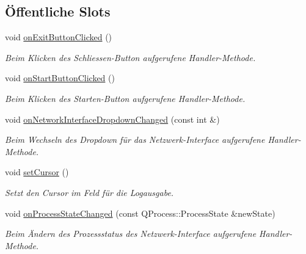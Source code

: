 \subsection*{Öffentliche Slots}
\begin{DoxyCompactItemize}
\item 
\hypertarget{class_server_a99f9b2f3521fb22772a61baf4f3c7bdc}{}\label{class_server_a99f9b2f3521fb22772a61baf4f3c7bdc} 
void \hyperlink{class_server_a99f9b2f3521fb22772a61baf4f3c7bdc}{on\+Exit\+Button\+Clicked} ()
\begin{DoxyCompactList}\small\item\em Beim Klicken des Schliessen-\/\+Button aufgerufene Handler-\/\+Methode. \end{DoxyCompactList}\item 
\hypertarget{class_server_abe8ac23afc4d282f89ec9fac8e7bf7f3}{}\label{class_server_abe8ac23afc4d282f89ec9fac8e7bf7f3} 
void \hyperlink{class_server_abe8ac23afc4d282f89ec9fac8e7bf7f3}{on\+Start\+Button\+Clicked} ()
\begin{DoxyCompactList}\small\item\em Beim Klicken des Starten-\/\+Button aufgerufene Handler-\/\+Methode. \end{DoxyCompactList}\item 
\hypertarget{class_server_abe493e7f3249149eea185fed02a06803}{}\label{class_server_abe493e7f3249149eea185fed02a06803} 
void \hyperlink{class_server_abe493e7f3249149eea185fed02a06803}{on\+Network\+Interface\+Dropdown\+Changed} (const int \&)
\begin{DoxyCompactList}\small\item\em Beim Wechseln des Dropdown für das Netzwerk-\/\+Interface aufgerufene Handler-\/\+Methode. \end{DoxyCompactList}\item 
\hypertarget{class_server_ac32ca0a80f4f1c8f4ec0f1f8db113efa}{}\label{class_server_ac32ca0a80f4f1c8f4ec0f1f8db113efa} 
void \hyperlink{class_server_ac32ca0a80f4f1c8f4ec0f1f8db113efa}{set\+Cursor} ()
\begin{DoxyCompactList}\small\item\em Setzt den Cursor im Feld für die Logausgabe. \end{DoxyCompactList}\item 
void \hyperlink{class_server_a08efa8bc9e0445b13be2af5b6a3037b2}{on\+Process\+State\+Changed} (const Q\+Process\+::\+Process\+State \&new\+State)
\begin{DoxyCompactList}\small\item\em Beim Ändern des Prozessstatus des Netzwerk-\/\+Interface aufgerufene Handler-\/\+Methode. \end{DoxyCompactList}\item 

\end{DoxyCompactItemize}
